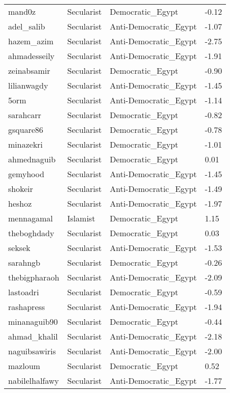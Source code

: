 \begin{longtable}{llll}
  mand0z & Secularist & Democratic\_Egypt & -0.12 \\ 
  adel\_salib & Secularist & Anti-Democratic\_Egypt & -1.07 \\ 
  hazem\_azim & Secularist & Anti-Democratic\_Egypt & -2.75 \\ 
  ahmadesseily & Secularist & Anti-Democratic\_Egypt & -1.91 \\ 
  zeinabsamir & Secularist & Democratic\_Egypt & -0.90 \\ 
  lilianwagdy & Secularist & Anti-Democratic\_Egypt & -1.45 \\ 
  5orm & Secularist & Anti-Democratic\_Egypt & -1.14 \\ 
  sarahcarr & Secularist & Democratic\_Egypt & -0.82 \\ 
  gsquare86 & Secularist & Democratic\_Egypt & -0.78 \\ 
  minazekri & Secularist & Democratic\_Egypt & -1.01 \\ 
  ahmednaguib & Secularist & Democratic\_Egypt & 0.01 \\ 
  gemyhood & Secularist & Anti-Democratic\_Egypt & -1.45 \\ 
  shokeir & Secularist & Anti-Democratic\_Egypt & -1.49 \\ 
  heshoz & Secularist & Anti-Democratic\_Egypt & -1.97 \\ 
  mennagamal & Islamist & Democratic\_Egypt & 1.15 \\ 
  theboghdady & Secularist & Democratic\_Egypt & 0.03 \\ 
  seksek & Secularist & Anti-Democratic\_Egypt & -1.53 \\ 
  sarahngb & Secularist & Democratic\_Egypt & -0.26 \\ 
  thebigpharaoh & Secularist & Anti-Democratic\_Egypt & -2.09 \\ 
  lastoadri & Secularist & Democratic\_Egypt & -0.59 \\ 
  rashapress & Secularist & Anti-Democratic\_Egypt & -1.94 \\ 
  minanaguib90 & Secularist & Democratic\_Egypt & -0.44 \\ 
  ahmad\_khalil & Secularist & Anti-Democratic\_Egypt & -2.18 \\ 
  naguibsawiris & Secularist & Anti-Democratic\_Egypt & -2.00 \\ 
  mazloum & Secularist & Democratic\_Egypt & 0.52 \\ 
  nabilelhalfawy & Secularist & Anti-Democratic\_Egypt & -1.77 \\ 

\end{longtable}
